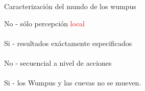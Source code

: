 \begin{frame}{Caracterizaci\'on del mundo de los wumpus}
    
     No - s\'olo percepci\'on \textcolor{red}{local}\\~\\
     Si - resultados ex\'actamente especificados\\~\\
     No - secuencial a nivel de acciones\\~\\
     Si - los Wumpus y las cuevas no se mueven.\\~\\
    
\end{frame}
